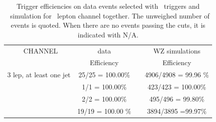\begin{table}[htbp]
	\centering
	\caption{Trigger efficiencies on data events selected with \Etmis\ triggers and \WZ\ simulation for \emumu\ lepton channel together. The unweighed number of events is quoted. When there are no events passing the cuts, it is indicated with N/A.}

	\begin{tabular}{cccc}
		\toprule 
		\emumu\ CHANNEL & {data} & &{WZ simulations} \\ 
		& Efficiency &  & Efficiency \\
		\midrule
		3 lep,  at least one jet & 25/25 = 100.00\%  & & 4906/4908 = 99.96 \%   \\ 
		\hline 
		\STSR & 1/1 = 100.00\% & & 423/423 = 100.00\%  \\ 
		\hline 
		\TTSR & 2/2 = 100.00\% &  & 495/496 = 99.80\% \\ 
		\hline 
		\WZCR & 19/19 = 100.00 \% &  & 3894/3895 =99.97\%  \\ 
		\bottomrule 
	\end{tabular} 
	\label{tab:trigSF}
\end{table}
